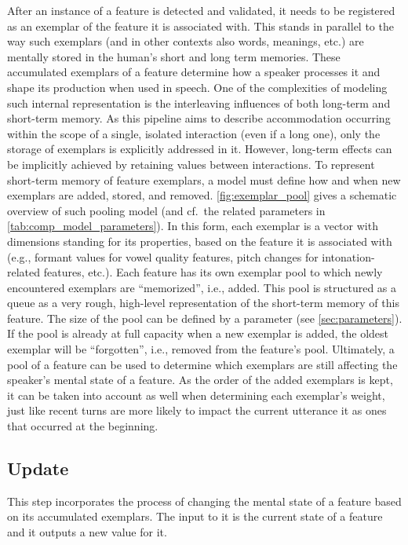 After an instance of a feature is detected and validated, it needs to be registered as an exemplar of the feature it is associated with.
This stands in parallel to the way such exemplars (and in other contexts also words, meanings, etc.) are mentally stored in the human's short and long term memories.
These accumulated exemplars of a feature determine how a speaker processes it and shape its production when used in speech.
One of the complexities of modeling such internal representation is the interleaving influences of both long-term and short-term memory.
As this pipeline aims to describe accommodation occurring within the scope of a single, isolated interaction (even if a long one), only the storage of exemplars is explicitly addressed in it.
However, long-term effects can be implicitly achieved by retaining values between interactions.
To represent short-term memory of feature exemplars, a model must define how and when new exemplars are added, stored, and removed.
\cref{fig:exemplar_pool} gives a schematic overview of such pooling model (and cf.\ the related parameters in \cref{tab:comp_model_parameters}).
In this form, each exemplar is a vector with dimensions standing for its properties, based on the feature it is associated with (e.g., formant values for vowel quality features, pitch changes for intonation-related features, etc.).
Each feature has its own exemplar pool to which newly encountered exemplars are \enquote{memorized}, i.e., added.
This pool is structured as a queue as a very rough, high-level representation of the short-term memory of this feature.
The size of the pool can be defined by a parameter (see \cref{sec:parameters}).
If the pool is already at full capacity when a new exemplar is added, the oldest exemplar will be \enquote{forgotten}, i.e., removed from the feature's pool.
Ultimately, a pool of a feature can be used to determine which exemplars are still affecting the speaker's mental state of a feature.
As the order of the added exemplars is kept, it can be taken into account as well when determining each exemplar's weight, just like recent turns are more likely to impact the current utterance it as ones that occurred at the beginning.

\subsection{Update}
\label{subsec:update}

This step incorporates the process of changing the mental state of a feature based on its accumulated exemplars.
The input to it is the current state of a feature and it outputs a new value for it.

